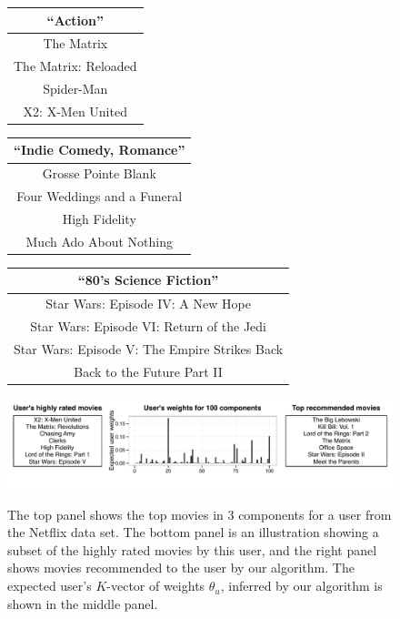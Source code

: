\begin{figure}[th]
\centering
\vspace{0.1cm}
\small
\begin{tabular}{c}
\toprule
\bf{``Action''}\\
\midrule
The Matrix\\
The Matrix: Reloaded\\
Spider-Man\\
X2: X-Men United\\
\bottomrule
\end{tabular}
\begin{tabular}{c}
\toprule
\bf{``Indie Comedy, Romance''}\\
\midrule
Grosse Pointe Blank\\
Four Weddings and a Funeral\\
High Fidelity\\
Much Ado About Nothing\\
\bottomrule
\end{tabular}
\begin{tabular}{c}
\toprule
\bf{``80's Science Fiction''}\\
\midrule
Star Wars: Episode IV: A New Hope\\
Star Wars: Episode VI: Return of the Jedi\\
Star Wars: Episode V: The Empire Strikes Back\\
Back to the Future Part II\\
\bottomrule
\end{tabular}

\vspace{0.5cm}

\centering
\includegraphics[width=\textwidth]{figures/netflix-exploratory.pdf}\\
\caption{ The top panel shows the top movies in 3 components for a
  user from the Netflix data set. The bottom panel is an illustration
  showing a subset of the highly rated movies by this user, and the
  right panel shows movies recommended to the user by our
  algorithm. The expected user's $K$-vector of weights $\theta_u$,
  inferred by our algorithm is shown in the middle panel.}
\label{fig:netflix-illustration}
\end{figure}

